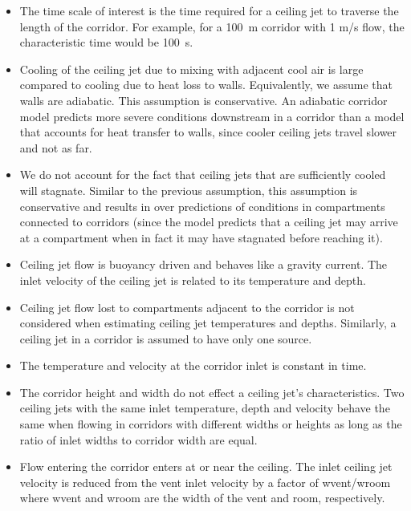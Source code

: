\begin{itemize}
\item The time scale of interest is the time required for a ceiling jet to traverse the length of the corridor. For example, for a 100~m corridor with 1 m/s flow, the characteristic time would be 100~s.

\item Cooling of the ceiling jet due to mixing with adjacent cool air is large compared to cooling due to heat loss to walls. Equivalently, we assume that walls are adiabatic.  This assumption is conservative. An adiabatic corridor model predicts more severe conditions downstream in a corridor than a model that accounts for heat transfer to walls, since cooler ceiling jets travel slower and not as far.

\item We do not account for the fact that ceiling jets that are sufficiently cooled will stagnate. Similar to the previous assumption, this assumption is conservative and results in over predictions of conditions in compartments connected to corridors (since the model predicts that a ceiling jet may arrive at a compartment when in fact it may have stagnated before reaching it).

\item Ceiling jet flow is buoyancy driven and behaves like a gravity current.  The inlet velocity of the ceiling jet is related to its temperature and depth.

\item Ceiling jet flow lost to compartments adjacent to the corridor is not considered when estimating ceiling jet temperatures and depths. Similarly, a ceiling jet in a corridor is assumed to have only one source.

\item The temperature and velocity at the corridor inlet is constant in time.

\item The corridor height and width do not effect a ceiling jet's characteristics. Two ceiling jets with the same inlet temperature, depth and velocity behave the same when flowing in corridors with different widths or heights as long as the ratio of inlet widths to corridor width are equal.

\item Flow entering the corridor enters at or near the ceiling. The inlet ceiling jet velocity is reduced from the vent inlet velocity by a factor of wvent/wroom where wvent and wroom  are the width of the vent and room, respectively.
\end{itemize}

